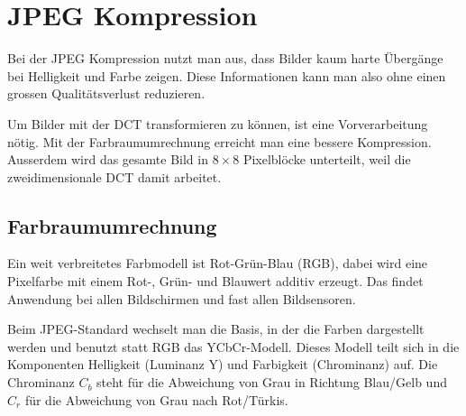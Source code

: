 %
%
%
%
\section{JPEG Kompression
\label{jpeg:section:kompjpeg}}
Bei der JPEG Kompression nutzt man aus, dass Bilder kaum harte Übergänge bei Helligkeit und Farbe zeigen.
Diese Informationen kann man also ohne einen grossen Qualitätsverlust reduzieren. 

Um Bilder mit der DCT transformieren zu können, ist eine Vorverarbeitung nötig. 
%
Mit der Farb\-raumumrechnung erreicht man eine bessere Kompression.
Ausserdem wird das gesamte Bild in \(8\times8\) Pixelblöcke unterteilt, weil die zweidimensionale DCT damit arbeitet.

\subsection{Farbraumumrechnung
\label{jpeg:subsection:farbraumumrechnung}}
Ein weit verbreitetes Farbmodell ist Rot-Grün-Blau (RGB), dabei wird eine Pixelfarbe mit einem Rot-, Grün- und Blauwert additiv erzeugt.
%
%
Das findet Anwendung bei allen Bildschirmen und fast allen Bildsensoren.

Beim JPEG-Standard wechselt man die Basis, in der die Farben dargestellt werden und benutzt statt RGB das YCbCr-Modell.
%
Dieses Modell teilt sich in die Komponenten Helligkeit (Luminanz Y) und Farbigkeit (Chrominanz) auf.
%
%
Die Chrominanz \(C_b\) steht für die Abweichung von Grau in Richtung Blau/Gelb und \(C_r\) für die Abweichung von Grau nach Rot/Türkis.

